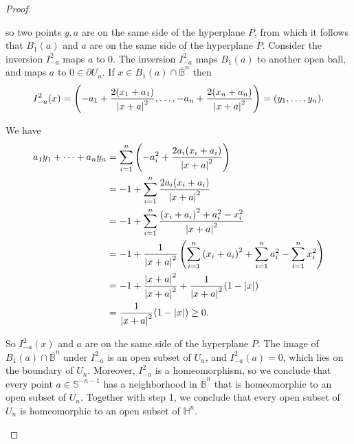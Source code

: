 \begin{proof}
\begin{enumerate}[label={\textbf{Step \arabic*.}},itemindent=1cm]
              so two points $y, a$ are on the same side of the hyperplane $P$, from which it follows that $B_{1}(a)$ and $a$ are on the same side of the hyperplane $P$. Consider the inversion $I^{2}_{-a}$ maps $a$ to $0$. The inversion $I^{2}_{-a}$ maps $B_{1}(a)$ to another open ball, and maps $a$ to $0\in \partial U_{n}$. If $x\in B_{1}(a) \cap\overline{\mathbb{B}}^{n}$ then
              \[
                  I^{2}_{-a}(x) = \left( -a_{1} + \frac{2(x_{1} + a_{1})}{\left\vert{x + a}\right\vert^{2}}, \ldots, -a_{n} + \frac{2(x_{n} + a_{n})}{\left\vert{x + a}\right\vert^{2}} \right) = (y_{1}, \ldots, y_{n}).
              \]

              We have
              \begingroup
              \allowdisplaybreaks{}
              \begin{align*}
                  a_{1}y_{1} + \cdots + a_{n}y_{n} & = \sum^{n}_{i=1}\left(-a_{i}^{2} + \frac{2a_{i}(x_{i} + a_{i})}{\left\vert{x + a}\right\vert^{2}}\right)                                                \\
                                                   & = -1 + \sum^{n}_{i=1}\frac{2a_{i}(x_{i} + a_{i})}{\left\vert{x + a}\right\vert^{2}}                                                                     \\
                                                   & = -1 + \sum^{n}_{i=1}\frac{{(x_{i} + a_{i})}^{2} + a_{i}^{2} - x_{i}^{2}}{\left\vert{x + a}\right\vert^{2}}                                             \\
                                                   & = -1 + \frac{1}{\left\vert{x + a}\right\vert^{2}}\left( \sum^{n}_{i=1}{(x_{i} + a_{i})}^{2} + \sum^{n}_{i=1}a_{i}^{2} - \sum^{n}_{i=1}x_{i}^{2} \right) \\
                                                   & = -1 + \frac{\left\vert{x+a}\right\vert^{2}}{\left\vert{x+a}\right\vert^{2}} + \frac{1}{\left\vert{x+a}\right\vert^{2}}(1 - \left\vert{x}\right\vert)                                                      \\
                                                   & = \frac{1}{\left\vert{x+a}\right\vert^{2}}(1 - \left\vert{x}\right\vert) \geq 0.
              \end{align*}
              \endgroup

              So $I^{2}_{-a}(x)$ and $a$ are on the same side of the hyperplane $P$. The image of $B_{1}(a)\cap \overline{\mathbb{B}}^{n}$ under $I^{2}_{-a}$ is an open subset of $U_{n}$, and $I^{2}_{-a}(a) = 0$, which lies on the boundary of $U_{n}$. Moreover, $I^{2}_{-a}$ is a homeomorphism, so we conclude that every point $a\in\mathbb{S}^{-n-1}$ has a neighborhood in $\overline{\mathbb{B}}^{n}$ that is homeomorphic to an open subset of $U_{n}$. Together with step 1, we conclude that every open subset of $U_{n}$ is homeomorphic to an open subset of $\mathbb{H}^{n}$.


\end{enumerate}
\end{proof}
